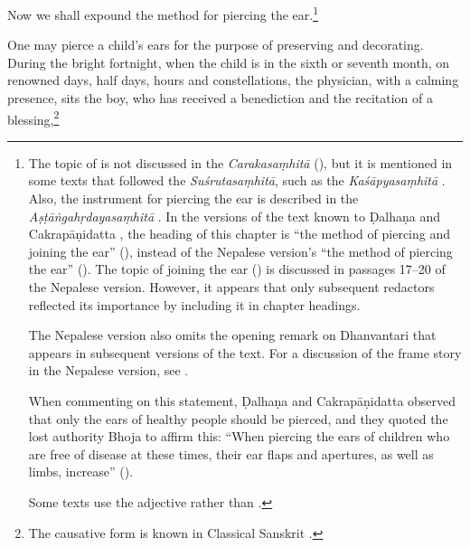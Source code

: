 \begin{translation}    
  
\item [1] 

Now we shall expound the method for piercing the ear.\footnote{The topic of 
     is not discussed in the \emph{Carakasaṃhitā}
    (\cite[IB, 326, n.\,175]{meul-hist}), but it is mentioned in some texts that
    followed the \emph{Suśrutasaṃhitā}, such as the \emph{Kaśāpyasaṃhitā} \citep[IIA,
    30]{meul-hist}. Also, the instrument for piercing the ear is described in the
    \emph{Aṣṭāṅgahṛdayasaṃhitā} . In the versions of the text known
    to Ḍalhaṇa \citep[76]{vulgate} and Cakrapāṇidatta \citep[125]{acar-1939}, the
    heading of this chapter is “the method of piercing and joining the ear”
    (), instead of the Nepalese version's “the method of
    piercing the ear” (). The topic of joining the ear
    () is discussed in passages 17--20 of the Nepalese version.
    However, it appears that only subsequent redactors reflected its importance by
    including it in chapter headings.

 The Nepalese version also omits the opening remark on Dhanvantari that appears in
subsequent versions of the text. For a discussion of the frame story in the
Nepalese version, see \cite{birc-2021}. 

When commenting on this statement, Ḍalhaṇa \citep[76]{vulgate} and
Cakrapāṇidatta \citep[125]{acar-1939} observed that only the ears of healthy
people should be pierced, and they quoted the lost authority Bhoja to affirm
this: “When piercing the ears of children who are free of disease at these
times, their ear flaps and apertures, as well as limbs, increase” ().

Some texts use the adjective  rather than .}

\item [2] 

One may pierce a child's ears for the purpose of preserving and decorating. During the
bright fortnight, when the child is in the sixth or seventh month, on renowned
days, half days, hours and constellations, the physician, with a calming presence,
sits the boy, who has received a benediction and the recitation of a
blessing,\footnote{The causative form  is known in Classical
    Sanskrit \citep[166]{whit-root}.

}
\end{translation}
